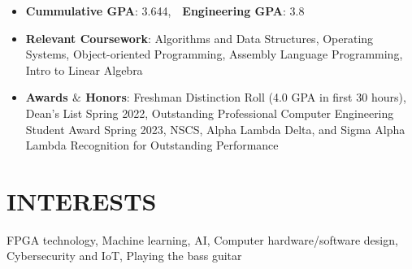 \documentclass[11pt,letterpaper]{article}
\begin{document}
\begin{itemize}
    \item \textbf{Cummulative GPA}: 3.644,\ \ \textbf{Engineering GPA}: 3.8
    \item \textbf{Relevant Coursework}: Algorithms and Data Structures, Operating Systems, Object-oriented Programming, Assembly Language Programming, Intro to Linear Algebra

    \item \textbf{Awards $\&$ Honors}: Freshman Distinction Roll (4.0 GPA in first 30 hours), Dean's List Spring 2022, Outstanding Professional Computer Engineering Student Award Spring 2023, NSCS, Alpha Lambda Delta, and Sigma Alpha Lambda Recognition for Outstanding Performance
\end{itemize}

\section*{INTERESTS}
FPGA technology, Machine learning, AI, Computer hardware/software design, Cybersecurity and IoT, Playing the bass guitar
\end{document}
